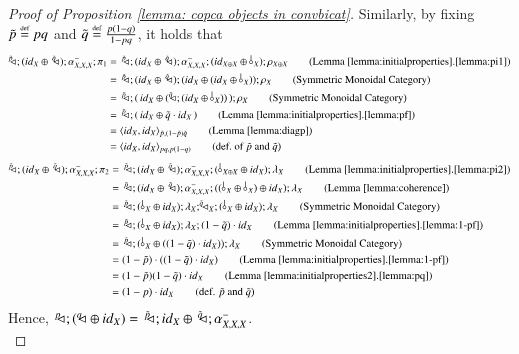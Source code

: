 \begin{proof}[Proof of Proposition \ref{lemma: copca objects in convbicat}]
Similarly, by fixing  $\tilde{p}\stackrel{\text{\tiny def}}{=}  pq$ and $\tilde{q} \stackrel{\text{\tiny def}}{=} \frac{p(1-q)}{1-pq}$, it holds  that
\begin{align}
    \diagptilde{}; (\id{X}\oplus\, \diagqtilde{}) ; \Iassoc{X}{X}{X}; \pi_1 &=\, \diagptilde{}; (\id{X}\oplus\,  \diagqtilde{}) ; \Iassoc{X}{X}{X}; ( \id{X \oplus X} \oplus \bang{X}) ; \runit{X\oplus X} \tag{Lemma \ref{lemma:initialproperties}.\ref{lemma:pi1}}\\
     &=\, \diagptilde{}; (\id{X}\oplus\, \diagqtilde{}) ; ( \id{X} \oplus (\id{X} \oplus \bang{X})) ; \runit{X} \tag{Symmetric Monoidal Category}\\
 &=\, \diagptilde{}; (\,\id{X}\oplus ( \diagqtilde{} ;(\id{X} \oplus \bang{X})) \,); \runit{X} \tag{Symmetric Monoidal Category}\\
&=\, \diagptilde{}; (\,\id{X}\oplus \tilde{q}\cdot \id{X} \,) \tag{Lemma \ref{lemma:initialproperties}.\ref{lemma:pf}}\\
    &=\langle \id{X}, \id{X} \rangle_{\tilde{p},(1-\tilde{p})\tilde{q}} \tag{Lemma \ref{lemma:diagp}}\\
    &= \langle \id{X}, \id{X} \rangle_{pq,p(1-q)} \tag{def.\ of $\tilde{p}$ and $\tilde{q}$}
\end{align} 
    \begin{align}%
    \diagptilde{}; (\id{X}\oplus\, \diagqtilde{}); \Iassoc{X}{X}{X};\pi_2&=\, \diagptilde{};( \id{X}\oplus\, \diagqtilde{}); \Iassoc{X}{X}{X}; (\bang{X\piu X}\piu \id{X});\lunit{X}  \tag{Lemma \ref{lemma:initialproperties}.\ref{lemma:pi2}}\\
    &=\, \diagptilde{};( \id{X}\oplus\, \diagqtilde{}); \Iassoc{X}{X}{X}; ((\bang{X}\piu \bang{X})\piu \id{X});\lunit{X}  \tag{Lemma \ref{lemma:coherence}}\\
    &=\, \diagptilde{}; (\bang{X} \oplus \id{X}); \lunit{X} ; \diagqtilde{X}; (\bang{X}\piu \id{X}) ;\lunit{X}  \tag{Symmetric Monoidal Category}\\
    &=\, \diagptilde{}; (\bang{X} \oplus \id{X}); \lunit{X} ; (1-\tilde{q})\cdot \id{X}  \tag{Lemma \ref{lemma:initialproperties}.\ref{lemma:1-pf}}\\
    &=\, \diagptilde{}; (\bang{X} \oplus ( (1-\tilde{q})\cdot \id{X} )) ;  \lunit{X} \tag{Symmetric Monoidal Category}\\
    &= (1-\tilde{p}) \cdot ((1-\tilde{q})\cdot \id{X} )  \tag{Lemma \ref{lemma:initialproperties}.\ref{lemma:1-pf}}\\
    &=  (1-\tilde{p}) (1-\tilde{q}) \cdot \id{X} \tag{Lemma \ref{lemma:initialproperties2}.\ref{lemma:pq}}\\
    &= (1-p) \cdot \id{X} \tag{def. $\tilde{p}$ and $\tilde{q}$}
\end{align}
    Hence, $\diagp{} ; (\diagq{} \oplus \id{X}) =\, \diagptilde{} ; \id{X}\oplus\, \diagqtilde{}; \Iassoc{X}{X}{X}$.\\


\end{proof}
